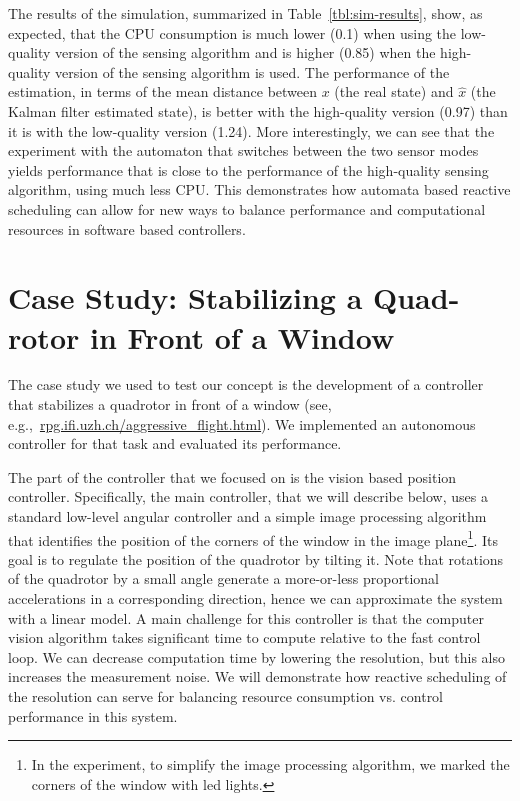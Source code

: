 \documentclass[ twoside, 12pt ]{article}
\begin{document}
The results of the simulation, summarized in Table~\ref{tbl:sim-results}, show, as expected, that the CPU consumption is much lower (0.1) when using the low-quality version of the sensing algorithm and is higher (0.85) when the high-quality version of the sensing algorithm is used. The performance of the estimation, in terms of the mean distance between $x$ (the real state) and $\hat x$ (the Kalman filter estimated state), is better with the high-quality version (0.97) than it is with the low-quality version (1.24). More interestingly, we can see that the experiment with the automaton that switches between the two sensor modes yields performance that is close to the performance of the high-quality sensing algorithm, using much less CPU. This demonstrates how automata based reactive scheduling can allow for new ways to balance performance and computational resources in software based controllers. 

\section{Case Study: Stabilizing a Quad-rotor in Front of a Window}
\label{sec:caseStudy}

The case study we used to test our concept is the development of a controller that stabilizes a quadrotor in front of a window (see, e.g.,~\url{rpg.ifi.uzh.ch/aggressive_flight.html}).
We implemented an autonomous controller for that task and evaluated its performance.

The part of the controller that we focused on is the vision based position controller. Specifically, the main controller, that we will describe below, uses a standard low-level angular controller and a simple image processing algorithm that identifies the position of the corners of the window in the image plane\footnote{In the experiment, to simplify the image processing algorithm, we marked the corners of the window with led lights.}. Its goal is to regulate the position of the quadrotor by tilting it. Note that rotations of the quadrotor by a small angle generate a more-or-less proportional accelerations in a corresponding direction, hence we can approximate the system with a linear model. A main challenge for this controller is that the computer vision algorithm takes significant time to compute relative to the fast control loop. We can decrease computation time by lowering the resolution, but this also increases the measurement noise. We will demonstrate how reactive scheduling of the resolution can serve for balancing resource consumption vs. control performance in this system.
\end{document}
